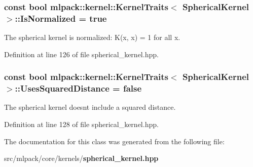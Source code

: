\subsubsection[{Is\+Normalized}]{\setlength{\rightskip}{0pt plus 5cm}const bool {\bf mlpack\+::kernel\+::\+Kernel\+Traits}$<$ {\bf Spherical\+Kernel} $>$\+::Is\+Normalized = true\hspace{0.3cm}{\ttfamily [static]}}\label{classmlpack_1_1kernel_1_1KernelTraits_3_01SphericalKernel_01_4_a507f43d3a9dc1ac91353e71ed292a904}


The spherical kernel is normalized\+: K(x, x) = 1 for all x. 



Definition at line 126 of file spherical\+\_\+kernel.\+hpp.

\subsubsection[{Uses\+Squared\+Distance}]{\setlength{\rightskip}{0pt plus 5cm}const bool {\bf mlpack\+::kernel\+::\+Kernel\+Traits}$<$ {\bf Spherical\+Kernel} $>$\+::Uses\+Squared\+Distance = false\hspace{0.3cm}{\ttfamily [static]}}\label{classmlpack_1_1kernel_1_1KernelTraits_3_01SphericalKernel_01_4_a03d7082cb06cf361fca72dfe285c34ef}


The spherical kernel doesn\textquotesingle{}t include a squared distance. 



Definition at line 128 of file spherical\+\_\+kernel.\+hpp.



The documentation for this class was generated from the following file\+:\begin{DoxyCompactItemize}
\item 
src/mlpack/core/kernels/{\bf spherical\+\_\+kernel.\+hpp}\end{DoxyCompactItemize}

